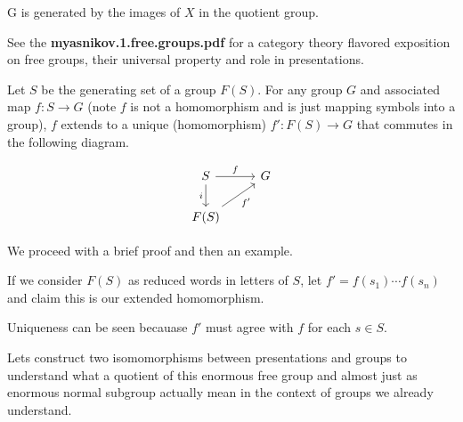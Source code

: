 \documentclass[10pt]{article}
\begin{document}
\begin{proposition}
	G is generated by the images of $X$ in the quotient group.
\end{proposition}

% 
% 

\begin{note}
	See the \textbf{myasnikov.1.free.groups.pdf} for a category theory flavored exposition on free
	groups, their universal property and role in presentations.
\end{note}

\begin{note}
Let $S$ be the generating set of a group $F(S)$. For any group $G$ and associated
map $f: S \to G$ (note $f$ is not a homomorphism and is just mapping symbols
into a group), $f$ extends to a unique (homomorphism) $f': F(S) \to G$ that commutes in the following diagram.

\[
\begin{tikzcd}
S \arrow[r, "f"] \arrow[d, "i"'] & G \\
F(S) \arrow[ru, "f'"']           &  
\end{tikzcd}
\]

We proceed with a brief proof and then an example.

If we consider $F(S)$ as reduced words in letters of $S$, let $f' =
f(s_1)\cdots f(s_n)$ and claim this is our extended homomorphism.

Uniqueness can be seen becauase $f'$ must agree with $f$ for each $s \in S$.

\end{note}

Lets construct two isomomorphisms between presentations and groups to understand
what a quotient of this enormous free group and almost just as enormous normal
subgroup actually mean in the context of groups we already understand.
\end{document}
